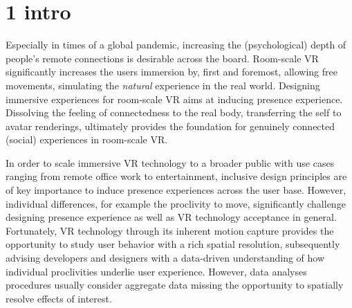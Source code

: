 \section{1 intro}
Especially in times of a global pandemic, increasing the (psychological) depth of people's remote connections is desirable across the board. Room-scale VR significantly increases the users immersion by, first and foremost, allowing free movements, simulating the \textit{natural} experience in the real world. Designing immersive experiences for room-scale VR aims at inducing presence experience. Dissolving the feeling of connectedness to the real body, transferring the self to avatar renderings, ultimately provides the foundation for genuinely connected (social) experiences in room-scale VR.

In order to scale immersive VR technology to a broader public with use cases ranging from remote office work to entertainment, inclusive design principles are of key importance to induce presence experiences across the user base. However, individual differences, for example the proclivity to move, significantly challenge designing presence experience as well as VR technology acceptance in general. Fortunately, VR technology through its inherent motion capture provides the opportunity to study user behavior with a rich spatial resolution, subsequently advising developers and designers with a data-driven understanding of how individual proclivities underlie user experience. However, data analyses procedures usually consider aggregate data missing the opportunity to spatially resolve effects of interest.


